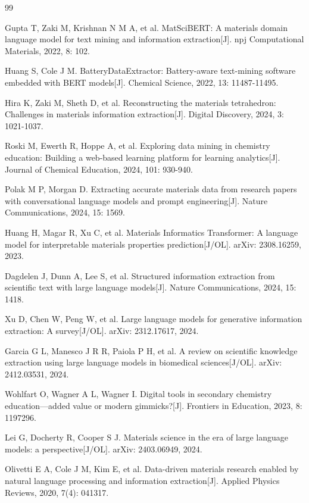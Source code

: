 \begin{thebibliography}{99}

 Gupta T, Zaki M, Krishnan N M A, et al. MatSciBERT: A materials domain language model for text mining and information extraction{[}J{]}. npj Computational Materials, 2022, 8: 102.

 Huang S, Cole J M. BatteryDataExtractor: Battery-aware text-mining software embedded with BERT models{[}J{]}. Chemical Science, 2022, 13: 11487-11495.

 Hira K, Zaki M, Sheth D, et al. Reconstructing the materials tetrahedron: Challenges in materials information extraction{[}J{]}. Digital Discovery, 2024, 3: 1021-1037.

 Roski M, Ewerth R, Hoppe A, et al. Exploring data mining in chemistry education: Building a web-based learning platform for learning analytics{[}J{]}. Journal of Chemical Education, 2024, 101: 930-940.

 Polak M P, Morgan D. Extracting accurate materials data from research papers with conversational language models and prompt engineering{[}J{]}. Nature Communications, 2024, 15: 1569.

 Huang H, Magar R, Xu C, et al. Materials Informatics Transformer: A language model for interpretable materials properties prediction{[}J/OL{]}. arXiv: 2308.16259, 2023.

 Dagdelen J, Dunn A, Lee S, et al. Structured information extraction from scientific text with large language models{[}J{]}. Nature Communications, 2024, 15: 1418.

 Xu D, Chen W, Peng W, et al. Large language models for generative information extraction: A survey{[}J/OL{]}. arXiv: 2312.17617, 2024.

 Garcia G L, Manesco J R R, Paiola P H, et al. A review on scientific knowledge extraction using large language models in biomedical sciences{[}J/OL{]}. arXiv: 2412.03531, 2024.

 Wohlfart O, Wagner A L, Wagner I. Digital tools in secondary chemistry education---added value or modern gimmicks?{[}J{]}. Frontiers in Education, 2023, 8: 1197296.

 Lei G, Docherty R, Cooper S J. Materials science in the era of large language models: a perspective{[}J/OL{]}. arXiv: 2403.06949, 2024.

 Olivetti E A, Cole J M, Kim E, et al. Data-driven materials research enabled by natural language processing and information extraction{[}J{]}. Applied Physics Reviews, 2020, 7(4): 041317.


\end{thebibliography}
